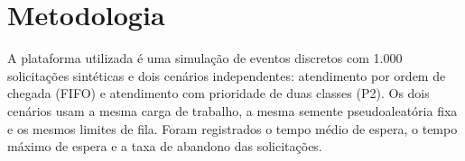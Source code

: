\section{Metodologia}
A plataforma utilizada é uma simulação de eventos discretos com 1.000 solicitações sintéticas e dois cenários independentes: atendimento por ordem de chegada (FIFO) e atendimento com prioridade de duas classes (P2).
Os dois cenários usam a mesma carga de trabalho, a mesma semente pseudoaleatória fixa e os mesmos limites de fila.
Foram registrados o tempo médio de espera, o tempo máximo de espera e a taxa de abandono das solicitações.
